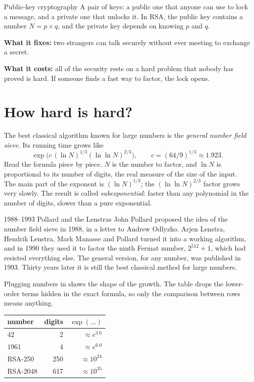 \begin{concept}{Public-key cryptography}
A pair of keys: a public one that anyone can use to lock a message, and a
private one that unlocks it. In RSA, the public key contains a number
$N = p \times q$, and the private key depends on knowing $p$ and $q$.

\textbf{What it fixes:} two strangers can talk securely without ever meeting to
exchange a secret.

\textbf{What it costs:} all of the security rests on a hard problem that nobody
has proved is hard. If someone finds a fast way to factor, the lock opens.
\end{concept}

\section{How hard is hard?}

The best classical algorithm known for large numbers is the \emph{general number
field sieve}. Its running time grows like
\[
  \exp\!\Big(c\,(\ln N)^{1/3}(\ln\ln N)^{2/3}\Big),
  \qquad c = (64/9)^{1/3} \approx 1.923 .
\]
Read the formula piece by piece. $N$ is the number to factor, and $\ln N$ is
proportional to its number of digits, the real measure of the size of the
input. The main part of the exponent is $(\ln N)^{1/3}$; the
$(\ln\ln N)^{2/3}$ factor grows very slowly. The result is called
\emph{subexponential}: faster than any polynomial in the number of digits,
slower than a pure exponential.

\begin{history}{1988--1993 \textperiodcentered{} Pollard and the Lenstras}
John Pollard proposed the idea of the number field sieve in 1988, in a letter
to Andrew Odlyzko. Arjen Lenstra, Hendrik Lenstra, Mark Manasse and Pollard
turned it into a working algorithm, and in 1990 they used it to factor the ninth
Fermat number, $2^{512}+1$, which had resisted everything else. The general
version, for any number, was published in 1993. Thirty years later it is still
the best classical method for large numbers.
\end{history}

Plugging numbers in shows the shape of the growth. The table drops the
lower-order terms hidden in the exact formula, so only the comparison between
rows means anything.

\begin{center}
\begin{tabular}{lrr}
\hline
number & digits & $\exp(\dots)$ \\
\hline
$42$ & 2 & $\approx e^{3.6}$ \\
$1961$ & 4 & $\approx e^{6.0}$ \\
RSA-250 & 250 & $\approx 10^{24}$ \\
RSA-2048 & 617 & $\approx 10^{35}$ \\
\hline
\end{tabular}
\end{center}

